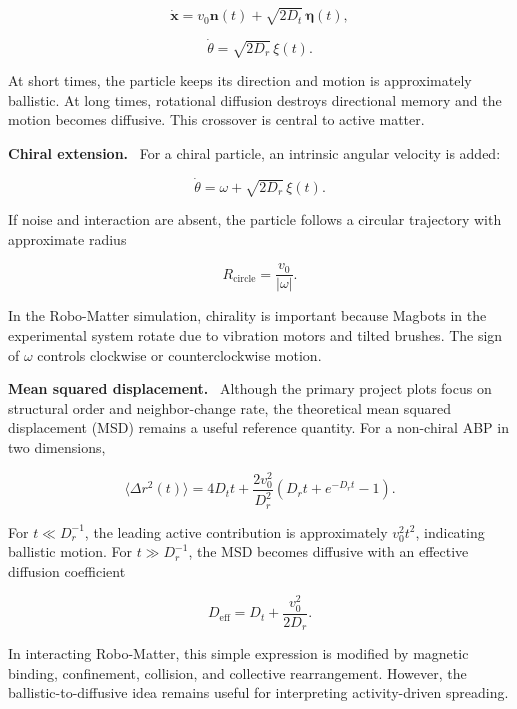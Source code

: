 \documentclass[12pt,a4paper,oneside]{report}
\newcommand{\runin}[1]{\vspace{0.45em}\noindent\textbf{#1.}\ }
\begin{document}
\begin{equation}
\dot{\mathbf{x}} = v_0 \mathbf{n}(t) + \sqrt{2D_t}\,\bm{\eta}(t),
\end{equation}

\begin{equation}
\dot{\theta} = \sqrt{2D_r}\,\xi(t).
\end{equation}

At short times, the particle keeps its direction and motion is approximately ballistic. At long times, rotational diffusion destroys directional memory and the motion becomes diffusive. This crossover is central to active matter.

\runin{Chiral extension}
For a chiral particle, an intrinsic angular velocity is added:

\begin{equation}
\dot{\theta} = \omega + \sqrt{2D_r}\,\xi(t).
\end{equation}

If noise and interaction are absent, the particle follows a circular trajectory with approximate radius

\begin{equation}
R_{\mathrm{circle}} = \frac{v_0}{|\omega|}.
\end{equation}

In the Robo-Matter simulation, chirality is important because Magbots in the experimental system rotate due to vibration motors and tilted brushes. The sign of $\omega$ controls clockwise or counterclockwise motion.

\runin{Mean squared displacement}
Although the primary project plots focus on structural order and neighbor-change rate, the theoretical mean squared displacement (MSD) remains a useful reference quantity. For a non-chiral ABP in two dimensions,

\begin{equation}
\langle \Delta r^2(t)\rangle =
4D_t t
+\frac{2v_0^2}{D_r^2}
\left(
D_r t + e^{-D_r t}-1
\right).
\end{equation}

For $t\ll D_r^{-1}$, the leading active contribution is approximately $v_0^2t^2$, indicating ballistic motion. For $t\gg D_r^{-1}$, the MSD becomes diffusive with an effective diffusion coefficient

\begin{equation}
D_{\mathrm{eff}} = D_t + \frac{v_0^2}{2D_r}.
\end{equation}

In interacting Robo-Matter, this simple expression is modified by magnetic binding, confinement, collision, and collective rearrangement. However, the ballistic-to-diffusive idea remains useful for interpreting activity-driven spreading.
\end{document}
